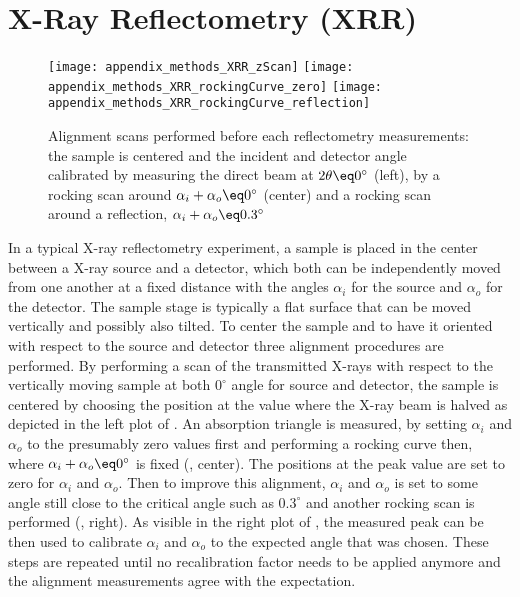 \documentclass[\main/dresen_thesis.tex]{subfiles}
\begin{document}
  \section{X-Ray Reflectometry (XRR)}
    \label{ch:methods:xrr}
    \begin{figure}[tb]
      \centering
      \texttt{[image: appendix\_methods\_XRR\_zScan]}
      \texttt{[image: appendix\_methods\_XRR\_rockingCurve\_zero]}
      \texttt{[image: appendix\_methods\_XRR\_rockingCurve\_reflection]}
      \caption{\label{fig:methods:xrr:alignment}Alignment scans performed before each reflectometry measurements: the sample is centered and the incident and detector angle calibrated by measuring the direct beam at $2 \theta \eq 0^\circ$ (left), by a rocking scan around $\alpha_i + \alpha_o \eq 0^\circ$ (center) and a rocking scan around a reflection, \eg $\alpha_i + \alpha_o \eq 0.3^\circ$}
    \end{figure}

    In a typical X-ray reflectometry experiment, a sample is placed in the center between a X-ray source and a detector, which both can be independently moved from one another at a fixed distance with the angles $\alpha_i$ for the source and $\alpha_o$ for the detector.
    The sample stage is typically a flat surface that can be moved vertically and possibly also tilted.
    To center the sample and to have it oriented with respect to the source and detector three alignment procedures are performed.
    By performing a scan of the transmitted X-rays with respect to the vertically moving sample at both $0^\circ$ angle for source and detector, the sample is centered by choosing the position at the value where the X-ray beam is halved as depicted in the left plot of .
    An absorption triangle is measured, by setting $\alpha_i$ and $\alpha_o$ to the presumably zero values first and performing a rocking curve then, where $\alpha_i + \alpha_o \eq 0^\circ$ is fixed (, center).
    The positions at the peak value are set to zero for $\alpha_i$ and $\alpha_o$.
    Then to improve this alignment, $\alpha_i$ and $\alpha_o$ is set to some angle still close to the critical angle such as $0.3^\circ$ and another rocking scan is performed  (, right).
    As visible in the right plot of , the measured peak can be then used to calibrate $\alpha_i$ and $\alpha_o$ to the expected angle that was chosen.
    These steps are repeated until no recalibration factor needs to be applied anymore and the alignment measurements agree with the expectation.
\end{document}
